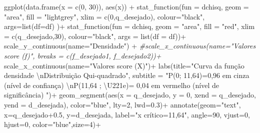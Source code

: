 \documentclass[
]{book}
\newenvironment{Shaded}{\begin{snugshade}}{\end{snugshade}}
\newcommand{\AttributeTok}[1]{\textcolor[rgb]{0.77,0.63,0.00}{#1}}
\newcommand{\CommentTok}[1]{\textcolor[rgb]{0.56,0.35,0.01}{\textit{#1}}}
\newcommand{\DecValTok}[1]{\textcolor[rgb]{0.00,0.00,0.81}{#1}}
\newcommand{\FloatTok}[1]{\textcolor[rgb]{0.00,0.00,0.81}{#1}}
\newcommand{\FunctionTok}[1]{\textcolor[rgb]{0.00,0.00,0.00}{#1}}
\newcommand{\NormalTok}[1]{#1}
\newcommand{\SpecialCharTok}[1]{\textcolor[rgb]{0.00,0.00,0.00}{#1}}
\newcommand{\StringTok}[1]{\textcolor[rgb]{0.31,0.60,0.02}{#1}}
\begin{document}
\begin{Shaded}
\begin{Highlighting}[]
\FunctionTok{ggplot}\NormalTok{(}\FunctionTok{data.frame}\NormalTok{(}\AttributeTok{x =} \FunctionTok{c}\NormalTok{(}\DecValTok{0}\NormalTok{, }\DecValTok{30}\NormalTok{)), }\FunctionTok{aes}\NormalTok{(x)) }\SpecialCharTok{+}
  \FunctionTok{stat\_function}\NormalTok{(}\AttributeTok{fun =}\NormalTok{ dchisq,}
                \AttributeTok{geom =} \StringTok{"area"}\NormalTok{,}
                \AttributeTok{fill =} \StringTok{"lightgrey"}\NormalTok{,}
                \AttributeTok{xlim =} \FunctionTok{c}\NormalTok{(}\DecValTok{0}\NormalTok{,q\_desejado),}
                \AttributeTok{colour=}\StringTok{"black"}\NormalTok{,}
                \AttributeTok{args=}\FunctionTok{list}\NormalTok{(}\AttributeTok{df=}\NormalTok{df) )}\SpecialCharTok{+}
  \FunctionTok{stat\_function}\NormalTok{(}\AttributeTok{fun =}\NormalTok{ dchisq,}
                \AttributeTok{geom =} \StringTok{"area"}\NormalTok{,}
                \AttributeTok{fill =} \StringTok{"red"}\NormalTok{,}
                \AttributeTok{xlim =} \FunctionTok{c}\NormalTok{(q\_desejado,}\DecValTok{30}\NormalTok{),}
                \AttributeTok{colour=}\StringTok{"black"}\NormalTok{,}
                \AttributeTok{args =} \FunctionTok{list}\NormalTok{(}\AttributeTok{df =}\NormalTok{ df))}\SpecialCharTok{+}
  \FunctionTok{scale\_y\_continuous}\NormalTok{(}\AttributeTok{name=}\StringTok{"Densidade"}\NormalTok{) }\SpecialCharTok{+}
  \CommentTok{\#scale\_x\_continuous(name="Valores score (f)", breaks = c(f\_desejado1, f\_desejado2))+  }
  \FunctionTok{scale\_x\_continuous}\NormalTok{(}\AttributeTok{name=}\StringTok{"Valores score (X)"}\NormalTok{)}\SpecialCharTok{+}  
  \FunctionTok{labs}\NormalTok{(}\AttributeTok{title=}\StringTok{"Curva da função densidade }\SpecialCharTok{\textbackslash{}n}\StringTok{Distribuição Qui{-}quadrado"}\NormalTok{, }
  \AttributeTok{subtitle =} \StringTok{"P(0; 11,64)=0,96 em cinza (nível de confiança) }\SpecialCharTok{\textbackslash{}n}\StringTok{P(11,64 ; \textbackslash{}U221e)= 0,04 em vermelho (nível de significância) "}\NormalTok{)}\SpecialCharTok{+}
  \FunctionTok{geom\_segment}\NormalTok{(}\FunctionTok{aes}\NormalTok{(}\AttributeTok{x =}\NormalTok{ q\_desejado, }\AttributeTok{y =} \DecValTok{0}\NormalTok{, }\AttributeTok{xend =}\NormalTok{ q\_desejado, }\AttributeTok{yend =}\NormalTok{ d\_desejada), }\AttributeTok{color=}\StringTok{"blue"}\NormalTok{, }\AttributeTok{lty=}\DecValTok{2}\NormalTok{, }\AttributeTok{lwd=}\FloatTok{0.3}\NormalTok{)}\SpecialCharTok{+}
  \FunctionTok{annotate}\NormalTok{(}\AttributeTok{geom=}\StringTok{"text"}\NormalTok{, }\AttributeTok{x=}\NormalTok{q\_desejado}\FloatTok{+0.5}\NormalTok{, }\AttributeTok{y=}\NormalTok{d\_desejada, }\AttributeTok{label=}\StringTok{"x crítico=11,64"}\NormalTok{, }\AttributeTok{angle=}\DecValTok{90}\NormalTok{, }\AttributeTok{vjust=}\DecValTok{0}\NormalTok{, }\AttributeTok{hjust=}\DecValTok{0}\NormalTok{, }\AttributeTok{color=}\StringTok{"blue"}\NormalTok{,}\AttributeTok{size=}\DecValTok{4}\NormalTok{)}\SpecialCharTok{+}

\end{Highlighting}
\end{Shaded}
\end{document}
